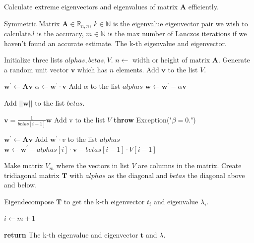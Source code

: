 \documentclass[11pt,openany]{book}
\begin{document}
 
    \begin{algorithm}
        \label{alg:lanczos}
        \caption{Calculate extreme eigenvectors and eigenvalues of matrix $\mathbf{A}$ efficiently.}
        \begin{algorithmic}
        
            \Require Symmetric Matrix $\mathbf{A} \in \mathbb{R}_{n,n}$, $k \in \mathbb{N}$ is the eigenvalue eigenvector pair we wish to calculate.$l$ is the accuracy, $m \in \mathbb{N}$ is the max number of Lanczos iterations if we haven't found an accurate estimate.
            \Ensure The k-th eigenvalue and eigenvector.
           
         
            \State Initialize three lists $alphas, betas, V$.
            \State $n \gets $ width or height of matrix $\mathbf{A}$.
            \State Generate a random unit vector $\mathbf{v}$ which has $n$ elements.
            \State Add $\mathbf{v}$ to the list $V$.
            
            \State $\mathbf{w}^{'} \gets \mathbf{A} \mathbf{v}$ 
            \State $\alpha \gets \mathbf{w}^{'} \cdot \mathbf{v}$
            \State Add $\alpha$ to the list $alphas$
            \State $\mathbf{w} \gets \mathbf{w}^{'} - \alpha \mathbf{v}$
            
            
            
                \State Add $||\mathbf{w}||$ to the list $betas$. 
                
                    \State $\mathbf{v} = \frac{1}{betas[i-1]}\mathbf{w}$
                    \State Add v to the list $V$
                \Else
                    \State \textbf{throw} Exception("$\beta = 0$.")
                \EndIf
                
                \State $\mathbf{w}^{'} \gets \mathbf{A}\mathbf{v}$
                \State Add $\mathbf{w}^{'} \cdot v$ to the list $alphas$
                \State $\mathbf{w} \gets \mathbf{w}^{'} - alphas[i] \cdot \mathbf{v} - betas[i - 1] \cdot V[i-1] $
                
                \State Make matrix $V_m$ where the vectors in list $V$ are columns in the matrix.
                \State Create tridiagonal matrix $\mathbf{T}$ with $alphas$ as the diagonal and $betas$ the diagonal above and below.
                
                \State Eigendecompose $\mathbf{T}$ to get the k-th eigenvector $t_i$ and eigenvalue $\lambda_i$.
                
                    \State $i \gets m + 1$
                \EndIf
            \EndFor
        
            \State \textbf{return} The k-th eigenvalue and eigenvector $\mathbf{t}$ and $\lambda$.
            \EndProcedure
        \end{algorithmic}
    \end{algorithm}
    
\end{document}
